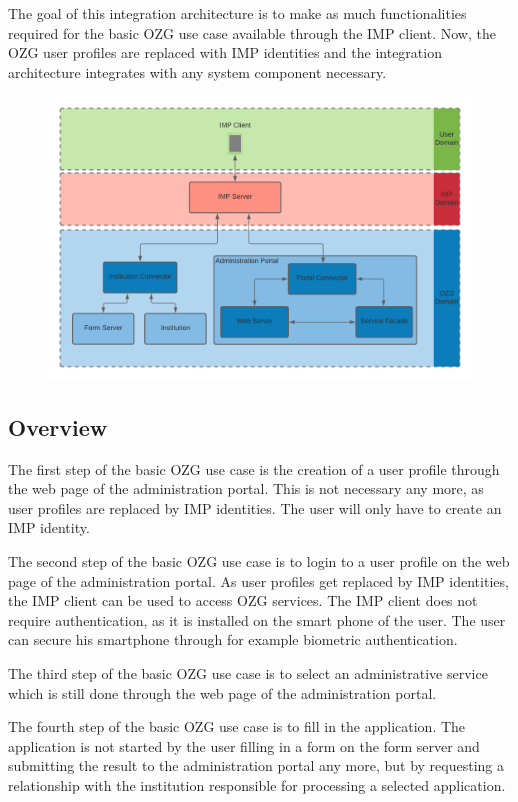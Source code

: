 \documentclass[
     12pt,         %
     a4paper,      %
     BCOR=10mm,version=first,     %
     DIV=14,version=first,        %
     ]{scrreprt}
\begin{document}
The goal of this integration architecture is to make as much functionalities required for the basic OZG use case available through the IMP client. Now, the OZG user profiles are replaced with IMP identities and the integration architecture integrates with any system component necessary.

\begin{figure}[h]
    \centering
    \includegraphics[scale=0.15]{Diagrams/Integration Architecture 2/Overview.png}
\end{figure}

\subsection{Overview}

The first step of the basic OZG use case is the creation of a user profile through the web page of the administration portal. This is not necessary any more, as user profiles are replaced by IMP identities. The user will only have to create an IMP identity.

The second step of the basic OZG use case is to login to a user profile on the web page of the administration portal. As user profiles get replaced by IMP identities, the IMP client can be used to access OZG services. The IMP client does not require authentication, as it is installed on the smart phone of the user. The user can secure his smartphone through for example biometric authentication.

The third step of the basic OZG use case is to select an administrative service which is still done through the web page of the administration portal.

The fourth step of the basic OZG use case is to fill in the application. The application is not started by the user filling in a form on the form server and submitting the result to the administration portal any more, but by requesting a relationship with the institution responsible for processing a selected application.
\end{document}
